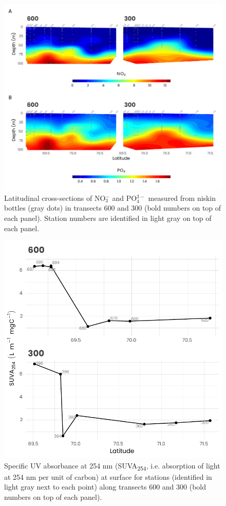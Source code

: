 \documentclass[essd, manuscript]{copernicus}
\begin{document}
\begin{figure}[H]
	\centering
	\includegraphics[scale = 1]{../../../graphs/fig04.pdf}
	\caption{Latitudinal cross-sections of NO$_3^-$ and PO$_4^{3-}$ measured from niskin bottles (gray dots) in transects 600 and 300 (bold numbers on top of each panel). Station numbers are identified in light gray on top of each panel.}
\end{figure}

\clearpage

\begin{figure}[H]
	\centering
	\includegraphics[scale = 1]{../../../graphs/fig05.pdf}
	\caption{Specific UV absorbance at 254 nm (SUVA\textsubscript{254}, i.e. absorption of light at 254 nm per unit of carbon) at surface for stations (identified in light gray next to each point) along transects 600 and 300 (bold numbers on top of each panel).}
\end{figure}
\end{document}
